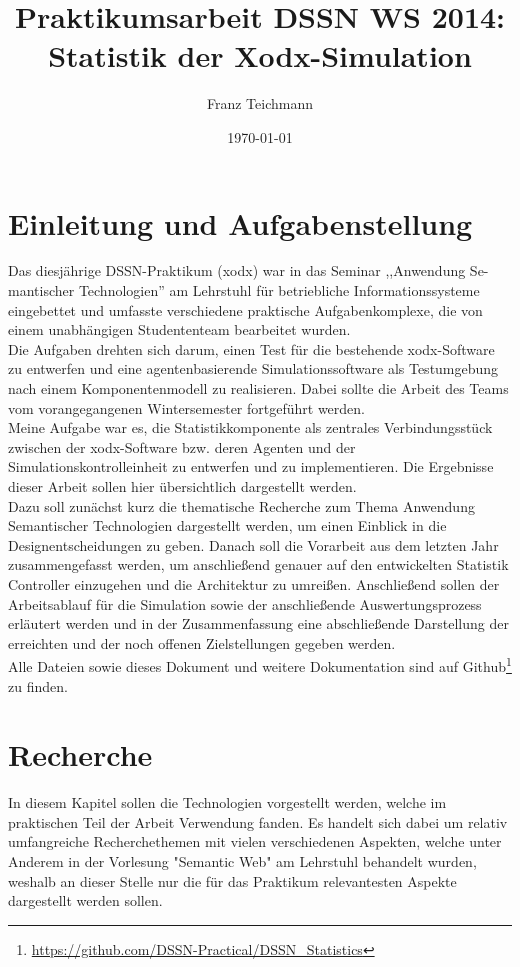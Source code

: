 \documentclass{article}
\title{Praktikumsarbeit DSSN WS 2014: \\ Statistik der Xodx-Simulation}
\author{Franz Teichmann}
\date{\today}
\begin{document}
\maketitle

\tableofcontents
\newpage

\section{Einleitung und Aufgabenstellung}

Das diesjährige DSSN-Praktikum (xodx) war in das Seminar ,,Anwendung Se-mantischer Technologien'' am Lehrstuhl für betriebliche Informationssysteme eingebettet und umfasste verschiedene praktische Aufgabenkomplexe, die von einem unabhängigen Studententeam bearbeitet wurden.\\
Die Aufgaben drehten sich darum, einen Test für die bestehende xodx-Software zu entwerfen und eine agentenbasierende Simulationssoftware als Testumgebung nach einem Komponentenmodell zu realisieren. Dabei sollte die Arbeit des Teams vom vorangegangenen Wintersemester fortgeführt werden.\\
Meine Aufgabe war es, die Statistikkomponente als zentrales Verbindungsstück zwischen der xodx-Software bzw. deren Agenten und der Simulationskontrolleinheit zu entwerfen und zu implementieren. Die Ergebnisse dieser Arbeit sollen hier übersichtlich dargestellt werden.\\
Dazu soll zunächst kurz die thematische Recherche zum Thema Anwendung Semantischer Technologien dargestellt werden, um einen Einblick in die Designentscheidungen zu geben. Danach soll die Vorarbeit aus dem letzten Jahr zusammengefasst werden, um anschließend genauer auf den entwickelten Statistik Controller einzugehen und die Architektur zu umreißen. Anschließend sollen der Arbeitsablauf für die Simulation sowie der anschließende Auswertungsprozess erläutert werden und in der Zusammenfassung eine abschließende Darstellung der erreichten und der noch offenen Zielstellungen gegeben werden.\\
Alle Dateien sowie dieses Dokument und weitere Dokumentation sind auf Github\footnote{\url{https://github.com/DSSN-Practical/DSSN_Statistics}} zu finden.

\section{Recherche}

In diesem Kapitel sollen die Technologien vorgestellt werden, welche im praktischen Teil der Arbeit Verwendung fanden. Es handelt sich dabei um relativ umfangreiche Recherchethemen mit vielen verschiedenen Aspekten, welche unter Anderem in der Vorlesung "Semantic Web" am Lehrstuhl behandelt wurden, weshalb an dieser Stelle nur die für das Praktikum relevantesten Aspekte dargestellt werden sollen.
\end{document}
